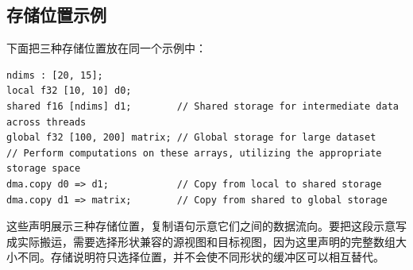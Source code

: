 \subsection*{存储位置示例}

下面把三种存储位置放在同一个示例中：

\begin{lstlisting}[language=croqtile,caption={示例代码：使用存储说明符}]
ndims : [20, 15];
local f32 [10, 10] d0;
shared f16 [ndims] d1;        // Shared storage for intermediate data across threads
global f32 [100, 200] matrix; // Global storage for large dataset
// Perform computations on these arrays, utilizing the appropriate storage space
dma.copy d0 => d1;            // Copy from local to shared storage
dma.copy d1 => matrix;        // Copy from shared to global storage
\end{lstlisting}

这些声明展示三种存储位置，复制语句示意它们之间的数据流向。要把这段示意写成实际搬运，需要选择形状兼容的源视图和目标视图，因为这里声明的完整数组大小不同。存储说明符只选择位置，并不会使不同形状的缓冲区可以相互替代。
